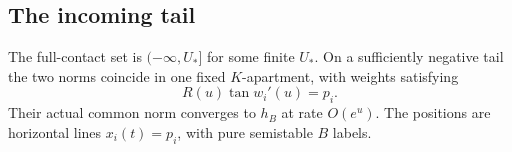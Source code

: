 \subsection{The incoming tail}

\begin{proposition}\label{prop:incomingtail}
The full-contact set is $(-\infty,U_*]$ for some finite $U_*$.
On a sufficiently negative tail the two norms coincide in one
fixed $K$-apartment, with weights satisfying
\begin{equation}\label{eq:incomingequation}
 R(u)\tan w_i'(u)=p_i.
\end{equation}
Their actual common norm converges to $h_B$ at rate $O(e^u)$.
The positions are horizontal lines $x_i(t)=p_i$, with pure
semistable $B$ labels.
\end{proposition}

